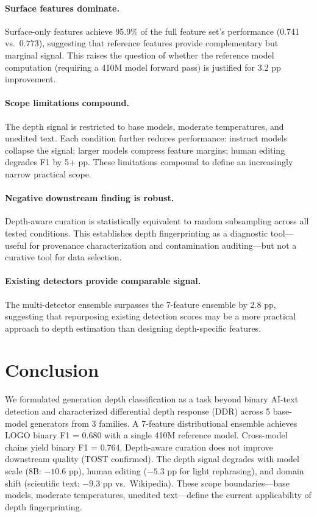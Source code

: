 \documentclass[11pt]{article}
\begin{document}
\paragraph{Surface features dominate.} Surface-only features achieve 95.9\% of the full feature set's performance (0.741 vs.\ 0.773), suggesting that reference features provide complementary but marginal signal. This raises the question of whether the reference model computation (requiring a 410M model forward pass) is justified for 3.2 pp improvement.

\paragraph{Scope limitations compound.} The depth signal is restricted to base models, moderate temperatures, and unedited text. Each condition further reduces performance: instruct models collapse the signal; larger models compress feature margins; human editing degrades F1 by 5+ pp. These limitations compound to define an increasingly narrow practical scope.

\paragraph{Negative downstream finding is robust.} Depth-aware curation is statistically equivalent to random subsampling across all tested conditions. This establishes depth fingerprinting as a diagnostic tool---useful for provenance characterization and contamination auditing---but not a curative tool for data selection.

\paragraph{Existing detectors provide comparable signal.} The multi-detector ensemble surpasses the 7-feature ensemble by 2.8 pp, suggesting that repurposing existing detection scores may be a more practical approach to depth estimation than designing depth-specific features.

\section{Conclusion}

We formulated generation depth classification as a task beyond binary AI-text detection and characterized differential depth response (DDR) across 5 base-model generators from 3 families. A 7-feature distributional ensemble achieves LOGO binary F1 = 0.680 with a single 410M reference model. Cross-model chains yield binary F1 = 0.764. Depth-aware curation does not improve downstream quality (TOST confirmed). The depth signal degrades with model scale (8B: $-10.6$ pp), human editing ($-5.3$ pp for light rephrasing), and domain shift (scientific text: $-9.3$ pp vs.\ Wikipedia). These scope boundaries---base models, moderate temperatures, unedited text---define the current applicability of depth fingerprinting.
\end{document}
